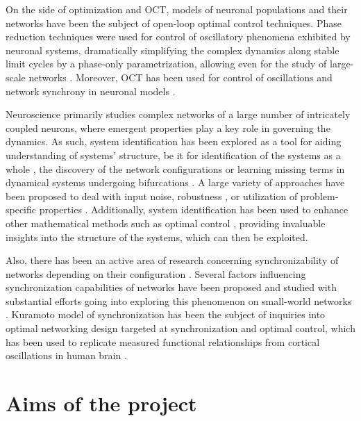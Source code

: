 \documentclass[a4paper,11pt]{scrartcl}
\begin{document}
On the side of optimization and \ac{OCT}, models of neuronal populations \cite{Salfenmoser2022, Salfenmoser2024} and their networks \cite{Chouzouris2021} have been the subject of open-loop optimal control techniques. Phase reduction \cite{Zlotnik2012, Dasanayake2011, Pietras2019} techniques were used for control of oscillatory phenomena exhibited by neuronal systems, dramatically simplifying the complex dynamics along stable limit cycles by a phase-only parametrization, allowing even for the study of large-scale networks \cite{Bomela2023}. Moreover, OCT has been used for control of oscillations and network synchrony in neuronal models \cite{Ruths2014, Orieux2024, Popovych2006, Costa2024}.

Neuroscience primarily studies complex networks of a large number of intricately coupled neurons, where emergent properties play a key role in governing the dynamics. As such, system identification has been explored as a tool for aiding understanding of systems' structure, be it for identification of the systems as a whole \cite{Brunton2016}, the discovery of the network configurations \cite{Owens2022} or learning missing terms in dynamical systems undergoing bifurcations \cite{VortmeyerKley2021}. A large variety of approaches have been proposed to deal with input noise, robustness \cite{Kaheman2020, Rosafalco2024}, or utilization of problem-specific properties \cite{Bisheban2017, Jongeneel2022}. Additionally, system identification has been used to enhance other mathematical methods such as optimal control \cite{Morrison2021}, providing invaluable insights into the structure of the systems, which can then be exploited.

Also, there has been an active area of research concerning synchronizability of networks depending on their configuration \cite{Hong2004}. Several factors influencing synchronization capabilities of networks have been proposed and studied with substantial efforts going into exploring this phenomenon on small-world networks \cite{Nishikawa2003}. Kuramoto model of synchronization has been the subject of inquiries into optimal networking design targeted at synchronization \cite{Fazlyab2017, Nishikawa2006} and optimal control, which has been used to replicate measured functional relationships from cortical oscillations in human brain \cite{Menara2022}.

\section{Aims of the project}\label{sec:aims}
\end{document}
